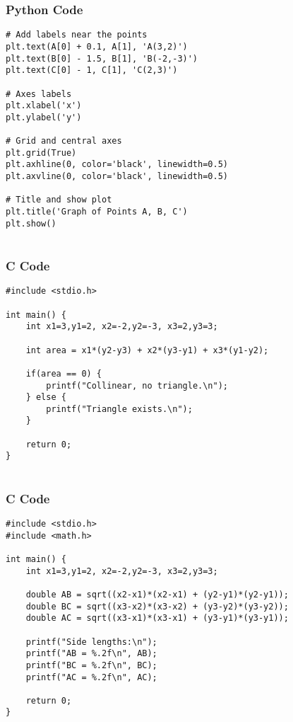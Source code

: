 \documentclass{beamer}
\begin{document}
\begin{frame}[fragile]
    \frametitle{Python Code}
    \begin{lstlisting}
# Add labels near the points
plt.text(A[0] + 0.1, A[1], 'A(3,2)')
plt.text(B[0] - 1.5, B[1], 'B(-2,-3)')
plt.text(C[0] - 1, C[1], 'C(2,3)')

# Axes labels
plt.xlabel('x')
plt.ylabel('y')

# Grid and central axes
plt.grid(True)
plt.axhline(0, color='black', linewidth=0.5)
plt.axvline(0, color='black', linewidth=0.5)

# Title and show plot
plt.title('Graph of Points A, B, C')
plt.show()


\end{lstlisting}
\end{frame}


\begin{frame}[fragile]
\frametitle{C Code}
\begin{lstlisting}
#include <stdio.h>

int main() {
    int x1=3,y1=2, x2=-2,y2=-3, x3=2,y3=3;
    
    int area = x1*(y2-y3) + x2*(y3-y1) + x3*(y1-y2);

    if(area == 0) {
        printf("Collinear, no triangle.\n");
    } else {
        printf("Triangle exists.\n");
    }

    return 0;
}


\end{lstlisting}

\end{frame}

\begin{frame}[fragile]
\frametitle{C Code}
\begin{lstlisting}
#include <stdio.h>
#include <math.h>

int main() {
    int x1=3,y1=2, x2=-2,y2=-3, x3=2,y3=3;

    double AB = sqrt((x2-x1)*(x2-x1) + (y2-y1)*(y2-y1));
    double BC = sqrt((x3-x2)*(x3-x2) + (y3-y2)*(y3-y2));
    double AC = sqrt((x3-x1)*(x3-x1) + (y3-y1)*(y3-y1));

    printf("Side lengths:\n");
    printf("AB = %.2f\n", AB);
    printf("BC = %.2f\n", BC);
    printf("AC = %.2f\n", AC);

    return 0;
}


\end{lstlisting}

\end{frame}
\end{document}
